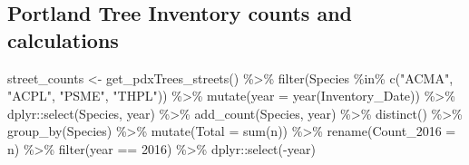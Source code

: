 \documentclass[12pt,twoside]{reedthesis}
\newenvironment{Shaded}{\begin{snugshade}}{\end{snugshade}}
\newcommand{\AttributeTok}[1]{\textcolor[rgb]{0.77,0.63,0.00}{#1}}
\newcommand{\DecValTok}[1]{\textcolor[rgb]{0.00,0.00,0.81}{#1}}
\newcommand{\FunctionTok}[1]{\textcolor[rgb]{0.00,0.00,0.00}{#1}}
\newcommand{\NormalTok}[1]{#1}
\newcommand{\OtherTok}[1]{\textcolor[rgb]{0.56,0.35,0.01}{#1}}
\newcommand{\SpecialCharTok}[1]{\textcolor[rgb]{0.00,0.00,0.00}{#1}}
\newcommand{\StringTok}[1]{\textcolor[rgb]{0.31,0.60,0.02}{#1}}
\begin{document}
\hypertarget{portland-tree-inventory-counts-and-calculations}{%
\subsection*{Portland Tree Inventory counts and calculations}\label{portland-tree-inventory-counts-and-calculations}}

\footnotesize
\begin{Shaded}
\begin{Highlighting}[]
\NormalTok{street\_counts }\OtherTok{\textless{}{-}} \FunctionTok{get\_pdxTrees\_streets}\NormalTok{() }\SpecialCharTok{\%\textgreater{}\%}
    \FunctionTok{filter}\NormalTok{(Species }\SpecialCharTok{\%in\%} \FunctionTok{c}\NormalTok{(}\StringTok{"ACMA"}\NormalTok{, }\StringTok{"ACPL"}\NormalTok{, }\StringTok{"PSME"}\NormalTok{, }\StringTok{"THPL"}\NormalTok{)) }\SpecialCharTok{\%\textgreater{}\%}
    \FunctionTok{mutate}\NormalTok{(}\AttributeTok{year =} \FunctionTok{year}\NormalTok{(Inventory\_Date)) }\SpecialCharTok{\%\textgreater{}\%}
\NormalTok{    dplyr}\SpecialCharTok{::}\FunctionTok{select}\NormalTok{(Species, year) }\SpecialCharTok{\%\textgreater{}\%}
    \FunctionTok{add\_count}\NormalTok{(Species, year) }\SpecialCharTok{\%\textgreater{}\%}
    \FunctionTok{distinct}\NormalTok{() }\SpecialCharTok{\%\textgreater{}\%}
    \FunctionTok{group\_by}\NormalTok{(Species) }\SpecialCharTok{\%\textgreater{}\%}
    \FunctionTok{mutate}\NormalTok{(}\AttributeTok{Total =} \FunctionTok{sum}\NormalTok{(n)) }\SpecialCharTok{\%\textgreater{}\%}
    \FunctionTok{rename}\NormalTok{(}\AttributeTok{Count\_2016 =}\NormalTok{ n) }\SpecialCharTok{\%\textgreater{}\%}
    \FunctionTok{filter}\NormalTok{(year }\SpecialCharTok{==} \DecValTok{2016}\NormalTok{) }\SpecialCharTok{\%\textgreater{}\%}
\NormalTok{    dplyr}\SpecialCharTok{::}\FunctionTok{select}\NormalTok{(}\SpecialCharTok{{-}}\NormalTok{year)}


\end{Highlighting}
\end{Shaded}
\end{document}
